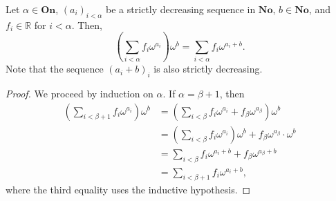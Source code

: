 \begin{lemma} \label{6.8} Let $\alpha \in \textbf{On}$, $(a_i)_{i<\alpha}$ be a strictly decreasing sequence in $\textbf{No}$, $b\in \textbf{No}$, and $f_i\in \mathds{R}$ for $i<\alpha$. Then,
$$\left ( \sum_{i<\alpha} f_i\omega^{a_i} \right ) \omega^b = \sum_{i<\alpha}f_i\omega^{a_i+b}.$$
Note that the sequence $(a_i+b)_i$ is also strictly decreasing.\end{lemma}

\begin{proof} We proceed by induction on $\alpha$.  If $\alpha=\beta +1$, then
\begin{align*}\left ( \sum_{i<\beta + 1} f_i\omega^{a_i} \right ) \omega^b 
	&= \left ( \sum_{i<\beta} f_i\omega^{a_i} + f_\beta \omega^{a_\beta} \right )\omega^b \\
	& = \left ( \sum_{i<\beta} f_i\omega^{a_i}\right ) \omega^b + f_\beta \omega^{a_\beta}\cdot \omega^b \\
	& = \sum_{i<\beta}f_i\omega^{a_i+b} + f_\beta\omega^{a_\beta+b} \\
	& = \sum_{i<\beta+1}f_i\omega^{a_i+b}, \end{align*}
where the third equality uses the inductive hypothesis.  


\end{proof}
